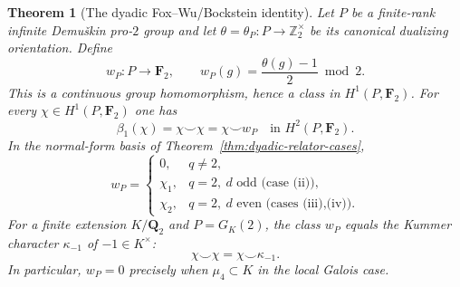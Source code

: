 \documentclass[11pt]{article}
\newtheorem{theorem}{Theorem}[section]
\theoremstyle{definition}
\begin{document}
\begin{theorem}[The dyadic Fox--Wu/Bockstein identity]
\label{thm:dyadic-fox-wu-bockstein}
Let $P$ be a finite-rank infinite Demu\v{s}kin pro-$2$ group
and let $\theta=\theta_P:P\to\mathbb Z_2^\times$
be its canonical dualizing orientation.  Define
\begin{equation}\label{eq:dyadic-fox-wu-class}
w_P:P\longrightarrow\mathbf F_2,\qquad
w_P(g)=\frac{\theta(g)-1}{2}\bmod2.
\end{equation}
This is a continuous group homomorphism, hence a class in
$H^1(P,\mathbf F_2)$.  For every
$\chi\in H^1(P,\mathbf F_2)$ one has
\begin{equation}\label{eq:dyadic-fox-wu-identity}
\boxed{\qquad
\beta_1(\chi)=\chi\smile\chi=\chi\smile w_P
\quad\text{in }H^2(P,\mathbf F_2).\qquad}
\end{equation}
In the normal-form basis of
Theorem~\ref{thm:dyadic-relator-cases},
\begin{equation}\label{eq:dyadic-wu-basis-values}
w_P=
\begin{cases}
0,&q\ne2,\\
\chi_1,&q=2,\ d\text{ odd (case (ii))},\\
\chi_2,&q=2,\ d\text{ even (cases (iii),(iv))}.
\end{cases}
\end{equation}
For a finite extension $K/\mathbf Q_2$ and
$P=G_K(2)$, the class $w_P$ equals the
Kummer character $\kappa_{-1}$ of $-1\in K^\times$:
\begin{equation}\label{eq:dyadic-kummer-minus-one}
\chi\smile\chi=\chi\smile\kappa_{-1}.
\end{equation}
In particular, $w_P=0$ precisely when $\mu_4\subset K$
in the local Galois case.
\end{theorem}
\end{document}
